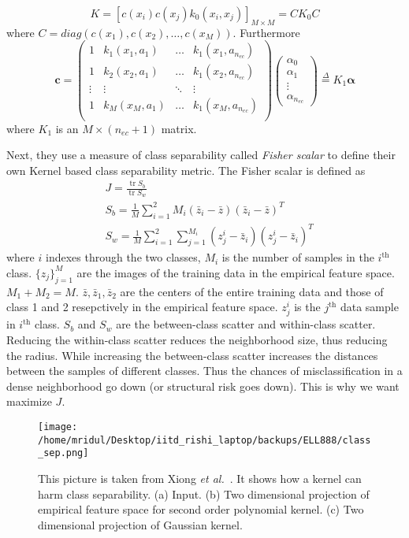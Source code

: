 \documentclass[11pt]{article}
\begin{document}
\[K=[c(x_i)c(x_j)k_0(x_i,x_j)]_{M\times M}=CK_0C\]
where $C=diag(c(x_1),c(x_2),\dotsc,c(x_M))$. Furthermore
\begin{equation}
    \label{eq:alk}
    \mathbf{c}=\begin{pmatrix}
        1&k_1(x_1,a_1)&\dots&k_1(x_1,a_{n_{ec}})\\
        1&k_2(x_2,a_1)&\dots&k_1(x_2,a_{n_{ec}})\\
        \vdots&\vdots&\ddots&\vdots\\
        1&k_M(x_M,a_1)&\dots&k_1(x_M,a_{n_{ec}})\\
        \end{pmatrix}\begin{pmatrix}
            \alpha_0\\
            \alpha_1\\
            \vdots\\
            \alpha_{n_{ec}}
    \end{pmatrix}\stackrel{\Delta}{=}K_1\mathbf{\alpha}
\end{equation}
where $K_1$ is an $M\times(n_{ec}+1)$ matrix.\par
Next, they use a measure of class separability called {\em Fisher scalar} to
define their own Kernel based class separability metric. The Fisher scalar is
defined as
\begin{align}
    &J=\frac{\operatorname{tr} S_b}{\operatorname{tr} S_w}\\
    &S_b=\frac{1}{M}\sum_{i=1}^2M_i(\bar{z}_i-\bar{z})(\bar{z}_i-\bar{z})^T\\
    &S_w=\frac{1}{M}\sum_{i=1}^2\sum_{j=1}^{M_i}(z_j^i-\bar{z}_i)(z_j^i-\bar{z}_i)^T
\end{align}
where $i$ indexes through the two classes, $M_i$ is the number of samples in the
$i^\text{th}$ class. $\{z_j\}_{j=1}^M$ are the images of the training data in
the empirical feature space. $M_1+M_2=M$. $\bar{z},\bar{z}_1,\bar{z}_2$ are the
centers of the entire training data and those of class 1 and 2 resepctively in
the empirical feature space. $z_j^i$ is the $j^\text{th}$ data sample in
$i^\text{th}$ class. $S_b$ and $S_w$ are the between-class scatter and
within-class scatter. Reducing the within-class scatter reduces the neighborhood
size, thus reducing the radius. While increasing the between-class scatter
increases the distances between the samples of different classes. Thus the
chances of misclassification in a dense neighborhood go down (or structural risk
goes down). This is why we want maximize $J$.
\begin{figure}[!htbp]
    \centering
    \texttt{[image: /home/mridul/Desktop/iitd\_rishi\_laptop/backups/ELL888/class\_sep.png]}
    \caption{\label{fig:6}This picture is taken from Xiong {\em et
    al.}~\cite{xiong}.  It shows how a kernel can harm class separability. (a)
    Input. (b) Two dimensional projection of empirical feature space for second
    order polynomial kernel. (c) Two dimensional projection of Gaussian kernel.}
\end{figure}
\end{document}
